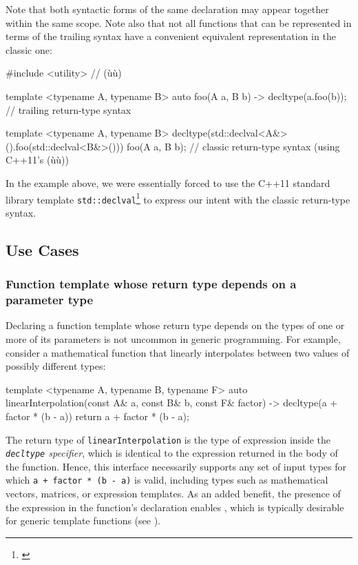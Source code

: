 \noindent Note that both syntactic forms of the same declaration may appear
together within the same scope. Note also that not all functions that
can be represented in terms of the trailing syntax have a convenient
equivalent representation in the classic one:

\begin{emcppslisting}
#include <utility>  // (ù{}ù)

template <typename A, typename B>
auto foo(A a, B b) -> decltype(a.foo(b));
    // trailing return-type syntax

template <typename A, typename B>
decltype(std::declval<A&>().foo(std::declval<B&>())) foo(A a, B b);
    // classic return-type syntax (using C++11's (ù{}ù))
\end{emcppslisting}

\noindent In the example above, we were essentially forced to use the C++11
standard library template \lstinline!std::declval!\footnote{\cite{cpprefdeclval}} to express our intent with the classic
return-type syntax.

\subsection[Use Cases]{Use Cases}\label{use-cases}

\subsubsection[Function template whose return type depends on a parameter type]{Function template whose return type depends on a parameter type}\label{function-template-whose-return-type-depends-on-a-parameter-type}

Declaring a function template whose return type depends on the types of
one or more of its parameters is not uncommon in generic programming.
For example, consider a mathematical function that linearly interpolates
between two values of possibly different types:

\begin{emcppslisting}
template <typename A, typename B, typename F>
auto linearInterpolation(const A& a, const B& b, const F& factor)
    -> decltype(a + factor * (b - a))
{
    return a + factor * (b - a);
}
\end{emcppslisting}

\noindent The return type of \lstinline!linearInterpolation! is the type of
expression inside the \emph{\lstinline!decltype! specifier}, which is
identical to the expression returned in the body of the function. Hence,
this interface necessarily supports any set of input types for which
\lstinline!a!~\lstinline!+!~\lstinline!factor!~\lstinline!*!~\lstinline!(b!~\lstinline!-!~\lstinline!a)!
is valid, including types such as mathematical vectors, matrices, or
expression templates. As an added benefit, the presence of the
expression in the function's declaration enables , which is typically desirable for generic template functions
(see %
).

